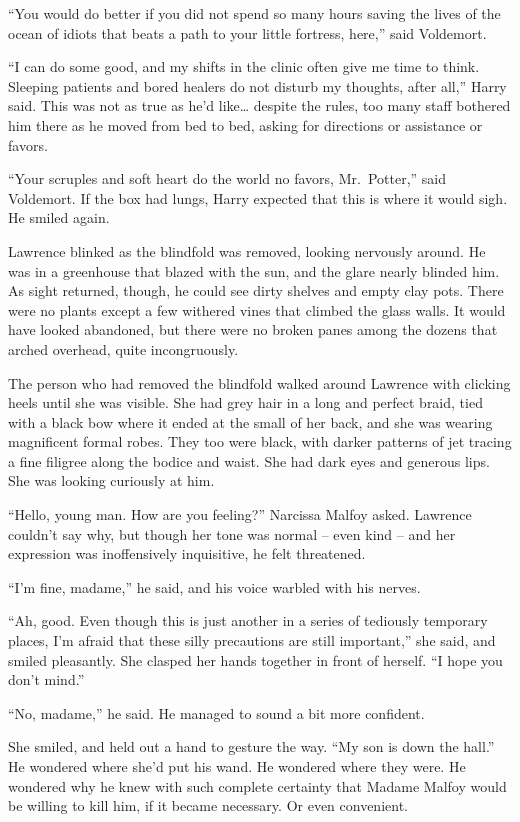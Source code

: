 ``You would do better if you did not spend so many hours saving the
lives of the ocean of idiots that beats a path to your little fortress,
here,'' said Voldemort.

``I can do some good, and my shifts in the clinic often give me time to
think. Sleeping patients and bored healers do not disturb my thoughts,
after all,'' Harry said. This was not as true as he'd like\ldots{}
despite the rules, too many staff bothered him there as he moved from
bed to bed, asking for directions or assistance or favors.

``Your scruples and soft heart do the world no favors, Mr.~Potter,''
said Voldemort. If the box had lungs, Harry expected that this is where
it would sigh. He smiled again.

\mybreak

Lawrence blinked as the blindfold was removed, looking nervously around.
He was in a greenhouse that blazed with the sun, and the glare nearly
blinded him. As sight returned, though, he could see dirty shelves and
empty clay pots. There were no plants except a few withered vines that
climbed the glass walls. It would have looked abandoned, but there were
no broken panes among the dozens that arched overhead, quite
incongruously.

The person who had removed the blindfold walked around Lawrence with
clicking heels until she was visible. She had grey hair in a long and
perfect braid, tied with a black bow where it ended at the small of her
back, and she was wearing magnificent formal robes. They too were black,
with darker patterns of jet tracing a fine filigree along the bodice and
waist. She had dark eyes and generous lips. She was looking curiously at
him.

``Hello, young man. How are you feeling?'' Narcissa Malfoy asked.
Lawrence couldn't say why, but though her tone was normal -- even kind
-- and her expression was inoffensively inquisitive, he felt threatened.

``I'm fine, madame,'' he said, and his voice warbled with his nerves.

``Ah, good. Even though this is just another in a series of tediously
temporary places, I'm afraid that these silly precautions are still
important,'' she said, and smiled pleasantly. She clasped her hands
together in front of herself. ``I hope you don't mind.''

``No, madame,'' he said. He managed to sound a bit more confident.

She smiled, and held out a hand to gesture the way. ``My son is down the
hall.'' He wondered where she'd put his wand. He wondered where they
were. He wondered why he knew with such complete certainty that Madame
Malfoy would be willing to kill him, if it became necessary. Or even
convenient.


